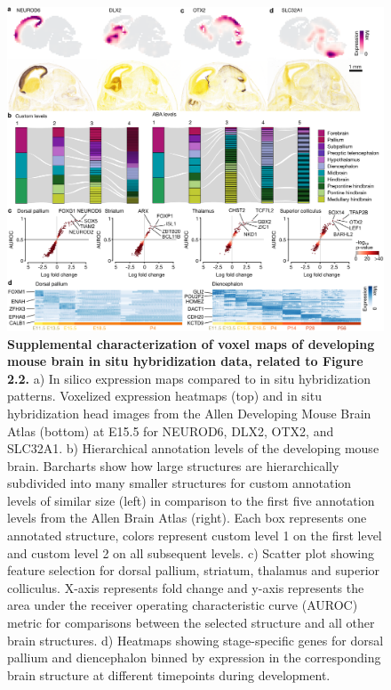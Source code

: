 \begin{figure}[h!]
    \centering
	\includegraphics[width=\textwidth]{figures/voxhunt/Supp_1}
    \caption{\textbf{Supplemental characterization of voxel maps of developing mouse brain in situ hybridization data, related to Figure 2.2.} a) In silico expression maps compared to in situ hybridization patterns. Voxelized expression heatmaps (top) and in situ hybridization head images from the Allen Developing Mouse Brain Atlas (bottom) at E15.5 for NEUROD6, DLX2, OTX2, and SLC32A1. b) Hierarchical annotation levels of the developing mouse brain. Barcharts show how large structures are hierarchically subdivided into many smaller structures for custom annotation levels of similar size (left) in comparison to the first five annotation levels from the Allen Brain Atlas (right). Each box represents one annotated structure, colors represent custom level 1 on the first level and custom level 2 on all subsequent levels. c) Scatter plot showing feature selection for dorsal pallium, striatum, thalamus and superior colliculus. X-axis represents fold change and y-axis represents the area under the receiver operating characteristic curve (AUROC) metric for comparisons between the selected structure and all other brain structures. d) Heatmaps showing stage-specific genes for dorsal pallium and diencephalon binned by expression in the corresponding brain structure at different timepoints during development.}
    \label{fig:voxS1}
\end{figure}

